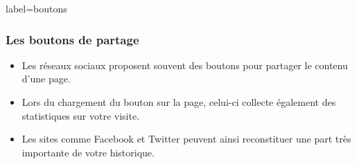 \documentclass{beamer}
\begin{document}
        \begin{frame}{label=boutons}
            \frametitle{Les boutons de partage}
            \begin{center}
                \begin{itemize}
                    \item Les réseaux sociaux proposent souvent des boutons pour partager le contenu d'une page.
                    \item Lors du chargement du bouton sur la page, celui-ci collecte également des statistiques sur votre visite.
                    \item Les sites comme Facebook et Twitter peuvent ainsi reconstituer une part très importante de votre historique.
                \end{itemize}
            \end{center}
        \end{frame}
\end{document}
